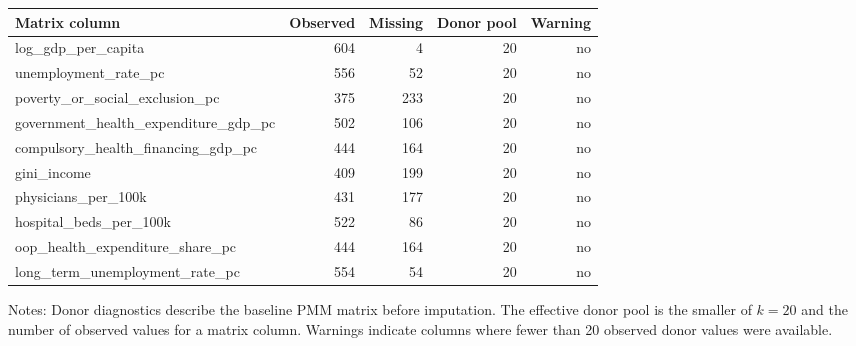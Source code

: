 \begin{tabular}{@{}lrrrr@{}}
\toprule
Matrix column & Observed & Missing & Donor pool & Warning \\
\midrule
log\_gdp\_per\_capita & 604 & 4 & 20 & no \\
unemployment\_rate\_pc & 556 & 52 & 20 & no \\
poverty\_or\_social\_exclusion\_pc & 375 & 233 & 20 & no \\
government\_health\_expenditure\_gdp\_pc & 502 & 106 & 20 & no \\
compulsory\_health\_financing\_gdp\_pc & 444 & 164 & 20 & no \\
gini\_income & 409 & 199 & 20 & no \\
physicians\_per\_100k & 431 & 177 & 20 & no \\
hospital\_beds\_per\_100k & 522 & 86 & 20 & no \\
oop\_health\_expenditure\_share\_pc & 444 & 164 & 20 & no \\
long\_term\_unemployment\_rate\_pc & 554 & 54 & 20 & no \\
\bottomrule
\end{tabular}

\vspace{0.2em}
\begin{minipage}{0.92\textwidth}\scriptsize Notes: Donor diagnostics describe the baseline PMM matrix before imputation. The effective donor pool is the smaller of \(k=20\) and the number of observed values for a matrix column. Warnings indicate columns where fewer than 20 observed donor values were available.\end{minipage}
